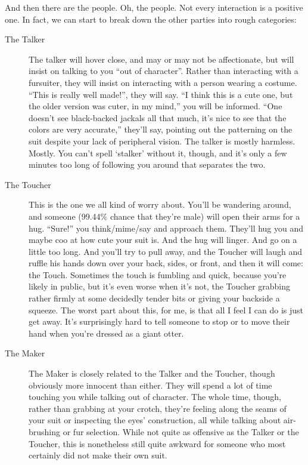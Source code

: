 And then there are the people.  Oh, the people.  Not every interaction is a positive one.  In fact, we can start to break down the other parties into rough categories:

\begin{description}
  \item[The Talker] The talker will hover close, and may or may not be affectionate, but will insist on talking to you ``out of character''.  Rather than interacting with a fursuiter, they will insist on interacting with a person wearing a costume.  ``This is really well made!'', they will say.  ``I think this is a cute one, but the older version was cuter, in my mind,'' you will be informed.  ``One doesn't see black-backed jackals all that much, it's nice to see that the colors are very accurate,'' they'll say, pointing out the patterning on the suit despite your lack of peripheral vision.  The talker is mostly harmless.  Mostly.  You can't spell `stalker' without it, though, and it's only a few minutes too long of following you around that separates the two.
  \item[The Toucher] This is the one we all kind of worry about.  You'll be wandering around, and someone (99.44\% chance that they're male) will open their arms for a hug.  ``Sure!'' you think/mime/say and approach them.  They'll hug you and maybe coo at how cute your suit is.  And the hug will linger.  And go on a little too long.  And you'll try to pull away, and the Toucher will laugh and ruffle his hands down over your back, sides, or front, and then it will come: the Touch.  Sometimes the touch is fumbling and quick, because you're likely in public, but it's even worse when it's not, the Toucher grabbing rather firmly at some decidedly tender bits or giving your backside a squeeze.  The worst part about this, for me, is that all I feel I can do is just get away.  It's surprisingly hard to tell someone to stop or to move their hand when you're dressed as a giant otter.
  \item[The Maker] The Maker is closely related to the Talker and the Toucher, though obviously more innocent than either.  They will spend a lot of time touching you while talking out of character.  The whole time, though, rather than grabbing at your crotch, they're feeling along the seams of your suit or inspecting the eyes' construction, all while talking about air-brushing or fur selection.  While not quite as offensive as the Talker or the Toucher, this is nonetheless still quite awkward for someone who most certainly did not make their own suit.

\end{description}
